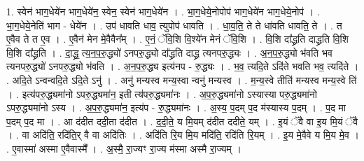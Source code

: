 \documentclass[17pt]{extarticle}
\begin{document}
1. स्वेन॑ भाग॒धेये॑न भाग॒धेये॑न॒ स्वेन॒ स्वेन॑ भाग॒धेये॑न । . भा॒ग॒धेये॒नोपोप॑ भाग॒धेये॑न भाग॒धेये॒नोप॑ । . भा॒ग॒धेये॒नेति॑ भाग - धेये॑न । . उप॑ धावति धाव॒ त्युपोप॑ धावति । . धा॒व॒ति॒ ते ते धा॑वति धावति॒ ते । . त ए॒वैव ते त ए॒व । . ए॒वैन॑ मेन मे॒वैवैन᳚म् । . ए॒नं॒ ॅवि॒शि वि॒श्ये॑न मेनं ॅवि॒शि । . वि॒शि दा᳚द्ध्रति दाद्ध्रति वि॒शि वि॒शि दा᳚द्ध्रति । . दा॒द्ध्र॒ त्य॒न॒प॒रु॒द्ध्यो॑ ऽनपरु॒द्ध्यो दा᳚द्ध्रति दाद्ध्र त्यनपरु॒द्ध्यः । . अ॒न॒प॒रु॒द्ध्यो भ॑वति भव त्यनपरु॒द्ध्यो॑ ऽनपरु॒द्ध्यो भ॑वति । . अ॒न॒प॒रु॒द्ध्य इत्य॑नप - रु॒द्ध्यः । . भ॒व॒ त्यदि॒ते ऽदि॑ते भवति भव॒ त्यदि॑ते । . अदि॒ते ऽन्वन्वदि॒ते ऽदि॒ते ऽनु॑ । . अनु॑ मन्यस्व मन्य॒स्वा न्वनु॑ मन्यस्व । . म॒न्य॒स्वे तीति॑ मन्यस्व मन्य॒स्वे ति॑ । . इत्य॑परु॒द्ध्यमा॑नो ऽपरु॒द्ध्यमा॑न॒ इती त्य॑परु॒द्ध्यमा॑नः । . अ॒प॒रु॒द्ध्यमा॑नो ऽस्यास्या परु॒द्ध्यमा॑नो ऽपरु॒द्ध्यमा॑नो ऽस्य । . अ॒प॒रु॒द्ध्यमा॑न॒ इत्य॑प - रु॒द्ध्यमा॑नः । . अ॒स्य॒ प॒दम् प॒द म॑स्यास्य प॒दम् । . प॒द मा प॒दम् प॒द मा । . आ द॑दीत ददी॒ता द॑दीत । . द॒दी॒ते॒ य मि॒यम् द॑दीत ददीते॒ यम् । . इ॒यं ॅवै वा इ॒य मि॒यं ॅवै । . वा अदि॑ति॒ रदि॑ति॒र् वै वा अदि॑तिः । . अदि॑ति रि॒य मि॒य मदि॑ति॒ रदि॑ति रि॒यम् । . इ॒य मे॒वैवे य मि॒य मे॒व । . ए॒वास्मा॑ अस्मा ए॒वैवास्मै᳚ । . अ॒स्मै॒ रा॒ज्यꣳ रा॒ज्य म॑स्मा अस्मै रा॒ज्यम् । \newline
\end{document}
